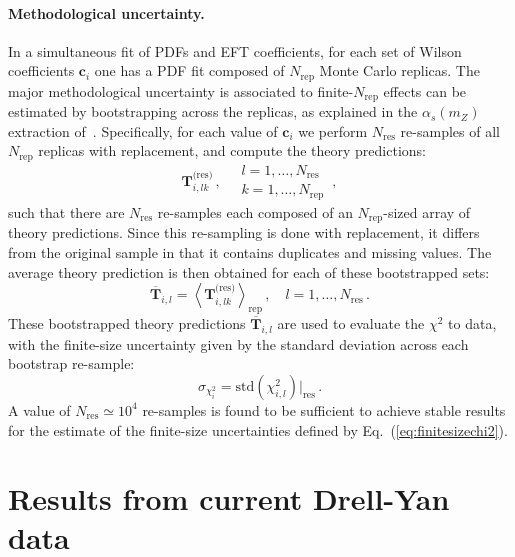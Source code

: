 \documentclass[withindex,glossary]{cam-thesis}
\begin{document}
\paragraph{Methodological uncertainty.} In a simultaneous fit of PDFs and EFT coefficients,
for each set of Wilson coefficients \(\mathbf{c}_i\)
one has a PDF fit composed of \(N_\text{rep}\) Monte Carlo replicas.
%
The major methodological uncertainty is associated to  finite-\(N_\text{rep}\) effects
can be estimated by bootstrapping across the replicas, as explained in the $\alpha_s(m_Z)$
extraction of~\cite{Ball:2018iqk}.
%
Specifically, for each value of \(\mathbf{c}_i\)
we perform \(N_\text{res}\) re-samples of all \(N_\text{rep}\) replicas with replacement, and compute the theory predictions:
\begin{equation}
  \mathbf{T}^{\text{(res)}}_{i,lk} \, ,\quad
  \begin{matrix}
    l = 1,\dots,N_\text{res} \\
    k = 1,\dots,N_\text{rep}
  \end{matrix} \, ,
\end{equation}
such that there are \(N_\text{res}\) re-samples each composed of an \(N_\text{rep}\)-sized array
of theory predictions.
%
Since this re-sampling is done with replacement,
it differs from the original sample in that it contains  duplicates and missing values.
%
The average theory prediction is then obtained for each of these bootstrapped sets:
\begin{equation}
  \overline{\mathbf{T}}_{i,l} = \left<\mathbf{T}^\text{(res)}_{i,lk}\right>_\text{rep}\, ,
  \quad l = 1,\dots,N_{\text{res}} \, .
\end{equation}
These bootstrapped  theory predictions $\overline{\mathbf{T}}_{i,l}$ are used to evaluate the $\chi^2$ to data,
with the finite-size uncertainty given by the standard deviation across each bootstrap re-sample:
\begin{equation}
  \label{eq:finitesizechi2}
  \sigma_{\chi^2_i} = \text{std}\left(\chi^2_{i,l}\right)\Big|_\text{res}\, .
\end{equation}
A value of $N_\text{res}\simeq 10^4$ re-samples is found to be sufficient to achieve stable results
for the estimate of the finite-size uncertainties defined by Eq.~(\ref{eq:finitesizechi2}).




\newpage
\section{Results from current Drell-Yan data}
\label{sec:res1}
\end{document}
